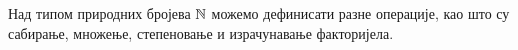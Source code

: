 Над типом природних бројева ${\mathbb{N}}$ можемо дефинисати разне операције, као што су сабирање, множење, степеновање и израчунавање факторијела.
\begin{code}%
\>[0]\AgdaSpace{}%
\AgdaSpace{}%
\<%
\\
\>[0]\AgdaSpace{}%
\AgdaSpace{}%
\<%
\\
\>[0]\AgdaSpace{}%
\AgdaSpace{}%
\<%
\\
\>[0]\AgdaSpace{}%
\AgdaSpace{}%
\AgdaOperator{\AgdaFunction{\AgdaUnderscore{}!}}\<%
\\
%
\\[\AgdaEmptyExtraSkip]%
\>[0]\AgdaSpace{}%
\AgdaSymbol{:}\AgdaSpace{}%
\AgdaSpace{}%
\AgdaSpace{}%
\AgdaSpace{}%
\AgdaSpace{}%
\<%
\\
\>[0]\AgdaSpace{}%
\AgdaSpace{}%
%
\>[14]\AgdaSymbol{=}\AgdaSpace{}%
\<%
\\
\>[0]\AgdaSymbol{(}\AgdaSpace{}%
\AgdaSymbol{)}\AgdaSpace{}%
\AgdaSpace{}%
\AgdaSpace{}%
\AgdaSymbol{=}\AgdaSpace{}%
\AgdaSpace{}%
\AgdaSymbol{(}\AgdaSpace{}%
\AgdaSpace{}%
\AgdaSymbol{)}\<%
\\
%
\\[\AgdaEmptyExtraSkip]%
\>[0]\AgdaSpace{}%
\AgdaSymbol{:}\AgdaSpace{}%
\AgdaSpace{}%
\AgdaSpace{}%
\AgdaSpace{}%
\AgdaSpace{}%
\<%
\\
\>[0]\AgdaSpace{}%
\AgdaSpace{}%
%
\>[14]\AgdaSymbol{=}\AgdaSpace{}%
\<%
\\
\>[0]\AgdaSymbol{(}\AgdaSpace{}%
\AgdaSymbol{)}\AgdaSpace{}%
\AgdaSpace{}%
\AgdaSpace{}%

\end{code}
